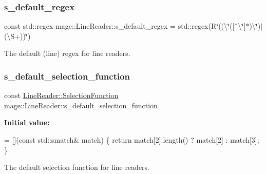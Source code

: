 \subsubsection{\texorpdfstring{s\+\_\+default\+\_\+regex}{s\_default\_regex}}
{\footnotesize\ttfamily const std\+::regex mage\+::\+Line\+Reader\+::s\+\_\+default\+\_\+regex = std\+::regex(R\char`\"{}((\textbackslash{}\char`\"{}(\mbox{[}$^\wedge$\textbackslash{}\char`\"{}\mbox{]}$\ast$)\textbackslash{}\char`\"{})$\vert$(\textbackslash{}S+))\char`\"{})\hspace{0.3cm}{\ttfamily [static]}}

The default (line) regex for line readers. \mbox{\label{classmage_1_1_line_reader_a93da10f6f69b44accfec8074712f35de}} 
\subsubsection{\texorpdfstring{s\+\_\+default\+\_\+selection\+\_\+function}{s\_default\_selection\_function}}
{\footnotesize\ttfamily const \mbox{\hyperlink{classmage_1_1_line_reader_a17bbae61a3ce30bdb251d6c76e1a4522}{Line\+Reader\+::\+Selection\+Function}} mage\+::\+Line\+Reader\+::s\+\_\+default\+\_\+selection\+\_\+function\hspace{0.3cm}{\ttfamily [static]}}

{\bfseries Initial value\+:}
\begin{DoxyCode}
= [](\textcolor{keyword}{const} std::smatch& match) \{
        \textcolor{keywordflow}{return} match[2].length() ? match[2] : match[3];
    \}
\end{DoxyCode}
The default selection function for line readers. 